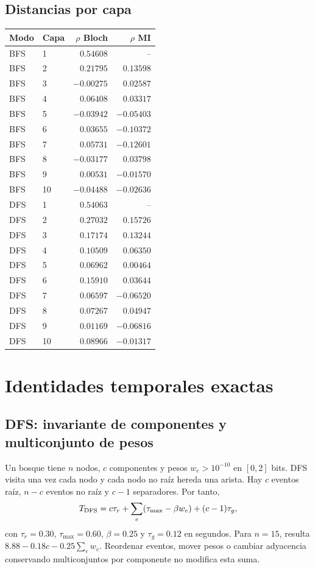 \documentclass[11pt,a4paper]{article}
\begin{document}
\subsection{Distancias por capa}
{\small\setlength{\tabcolsep}{5pt}
\begin{longtable}{llrr}
\toprule
Modo & Capa & $\rho$ Bloch & $\rho$ MI \\
\midrule\endhead
BFS & 1 & $0.54608$ & -- \\
BFS & 2 & $0.21795$ & $0.13598$ \\
BFS & 3 & $-0.00275$ & $0.02587$ \\
BFS & 4 & $0.06408$ & $0.03317$ \\
BFS & 5 & $-0.03942$ & $-0.05403$ \\
BFS & 6 & $0.03655$ & $-0.10372$ \\
BFS & 7 & $0.05731$ & $-0.12601$ \\
BFS & 8 & $-0.03177$ & $0.03798$ \\
BFS & 9 & $0.00531$ & $-0.01570$ \\
BFS & 10 & $-0.04488$ & $-0.02636$ \\
DFS & 1 & $0.54063$ & -- \\
DFS & 2 & $0.27032$ & $0.15726$ \\
DFS & 3 & $0.17174$ & $0.13244$ \\
DFS & 4 & $0.10509$ & $0.06350$ \\
DFS & 5 & $0.06962$ & $0.00464$ \\
DFS & 6 & $0.15910$ & $0.03644$ \\
DFS & 7 & $0.06597$ & $-0.06520$ \\
DFS & 8 & $0.07267$ & $0.04947$ \\
DFS & 9 & $0.01169$ & $-0.06816$ \\
DFS & 10 & $0.08966$ & $-0.01317$ \\
\bottomrule
\end{longtable}}


\section{Identidades temporales exactas}
\subsection{DFS: invariante de componentes y multiconjunto de pesos}
Un bosque tiene $n$ nodos, $c$ componentes y pesos $w_e>10^{-10}$ en $[0,2]$ bits. DFS visita una vez cada nodo y cada nodo no raíz hereda una arista. Hay $c$ eventos raíz, $n-c$ eventos no raíz y $c-1$ separadores. Por tanto,
\[
T_{\rm DFS}=c\tau_r+\sum_e(\tau_{\max}-\beta w_e)+(c-1)\tau_g,
\]
con $\tau_r=0.30$, $\tau_{\max}=0.60$, $\beta=0.25$ y $\tau_g=0.12$ en segundos. Para $n=15$, resulta $8.88-0.18c-0.25\sum_e w_e$. Reordenar eventos, mover pesos o cambiar adyacencia conservando multiconjuntos por componente no modifica esta suma.
\end{document}
